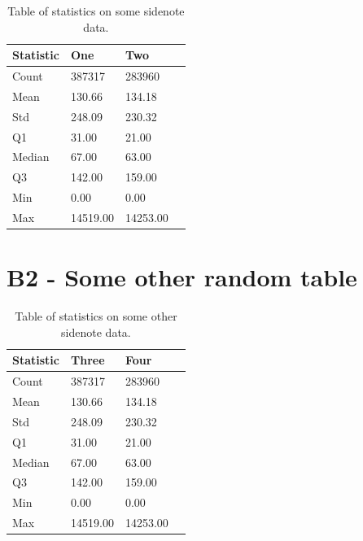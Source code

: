 \begin{table}[ht!]
\centering
    \begin{tabular}{ m{4cm} m{2.5cm} m{2.5cm} m{2.5cm} } 
    \toprule
    \toprule
    \textbf{Statistic} & \textbf{One} & \textbf{Two}  \\
    \midrule
    Count   & 387317    & 283960    \\[1.3ex]
    Mean    & 130.66    & 134.18    \\[1.3ex]
    Std     & 248.09    & 230.32    \\[1.3ex]
    Q1      & 31.00     & 21.00     \\[1.3ex]
    Median  & 67.00     & 63.00     \\[1.3ex]
    Q3      & 142.00    & 159.00    \\[1.3ex]
    Min     & 0.00      & 0.00      \\[1.3ex]
    Max     & 14519.00  & 14253.00  \\[1.3ex]
    \bottomrule
    \bottomrule
    \end{tabular}
\caption[Statistics on something]{Table of statistics on some sidenote data.}
\end{table}


\newpage
\vspace*{0.5cm}
\section*{\large{B2 - Some other random table}}
\vspace*{1cm}

\begin{table}[ht!]
\centering
    \begin{tabular}{ m{4cm} m{2.5cm} m{2.5cm} m{2.5cm} } 
    \toprule
    \toprule
    \textbf{Statistic} & \textbf{Three} & \textbf{Four}  \\
    \midrule
    Count   & 387317    & 283960    \\[1.3ex]
    Mean    & 130.66    & 134.18    \\[1.3ex]
    Std     & 248.09    & 230.32    \\[1.3ex]
    Q1      & 31.00     & 21.00     \\[1.3ex]
    Median  & 67.00     & 63.00     \\[1.3ex]
    Q3      & 142.00    & 159.00    \\[1.3ex]
    Min     & 0.00      & 0.00      \\[1.3ex]
    Max     & 14519.00  & 14253.00  \\[1.3ex]
    \bottomrule
    \bottomrule
    \end{tabular}
\caption[Statistics on something else]{Table of statistics on some other sidenote data.}
\end{table}



